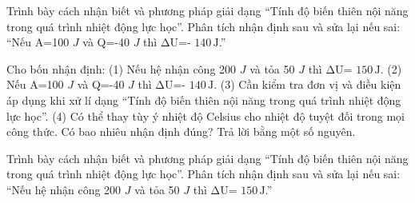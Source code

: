 \begin{bt}
Trình bày cách nhận biết và phương pháp giải dạng “Tính độ biến thiên nội năng trong quá trình nhiệt động lực học”. Phân tích nhận định sau và sửa lại nếu sai: “Nếu A=100 $J$ và Q=-40 $J$ thì ΔU=- $140\,\text{J}$.”
\end{bt}


\begin{ex}
Cho bốn nhận định: (1) Nếu hệ nhận công 200 $J$ và tỏa 50 $J$ thì ΔU= $150\,\text{J}$. (2) Nếu A=100 $J$ và Q=-40 $J$ thì ΔU=- $140\,\text{J}$. (3) Cần kiểm tra đơn vị và điều kiện áp dụng khi xử lí dạng “Tính độ biến thiên nội năng trong quá trình nhiệt động lực học”. (4) Có thể thay tùy ý nhiệt độ Celsius cho nhiệt độ tuyệt đối trong mọi công thức. Có bao nhiêu nhận định đúng? Trả lời bằng một số nguyên.
\end{ex}

\begin{bt}
Trình bày cách nhận biết và phương pháp giải dạng “Tính độ biến thiên nội năng trong quá trình nhiệt động lực học”. Phân tích nhận định sau và sửa lại nếu sai: “Nếu hệ nhận công 200 $J$ và tỏa 50 $J$ thì ΔU= $150\,\text{J}$.”
\end{bt}

